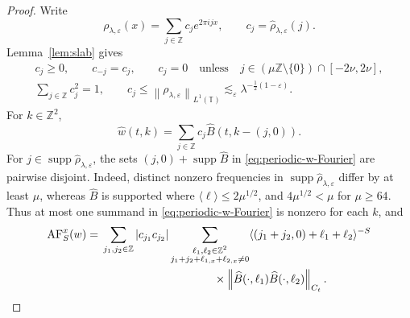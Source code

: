 \documentclass[12pt,reqno,letterpaper]{amsart}
\numberwithin{equation}{section}
\theoremstyle{definition}
\newcommand{\T}{\mathbb T}
\newcommand{\Z}{\mathbb Z}
\newcommand{\eps}{\varepsilon}
\newcommand{\la}{\lambda}
\newcommand{\supp}{\operatorname{supp}}
\newcommand{\norm}[1]{\left\lVert #1\right\rVert}
\newcommand{\abs}[1]{\left\lvert #1\right\rvert}
\begin{document}
\begin{proof}
Write
\begin{equation*}
   \rho_{\la,\eps}(x)=\sum_{j\in\Z}c_je^{2\pi ijx},
   \qquad c_j=\widehat\rho_{\la,\eps}(j).
\end{equation*}
Lemma~\ref{lem:slab} gives
\begin{equation}\label{eq:periodic-profile-coefficients}
\begin{gathered}
   c_j\geq0,\qquad c_{-j}=c_j,\qquad
   c_j=0\quad\text{unless}\quad
       j\in(\mu\Z\setminus\{0\})\cap[-2\nu,2\nu],\\
   \sum_{j\in\Z}c_j^2=1,\qquad
   c_j\leq\norm{\rho_{\la,\eps}}_{L^1(\T)}
       \lesssim_\eps\la^{-\frac12(1-\eps)}.
\end{gathered}
\end{equation}
For $k\in\Z^2$,
\begin{equation}\label{eq:periodic-w-Fourier}
   \widehat w(t,k)
      =\sum_{j\in\Z}c_j
          \widehat B(t,k-(j,0)).
\end{equation}
For $j\in\supp\widehat\rho_{\la,\eps}$, the sets
$(j,0)+\supp\widehat B$ in \eqref{eq:periodic-w-Fourier} are pairwise
disjoint.  Indeed, distinct nonzero frequencies in
$\supp\widehat\rho_{\la,\eps}$ differ by at least
$\mu$, whereas $\widehat B$ is supported where
$\langle\ell\rangle\leq2\mu^{1/2}$, and $4\mu^{1/2}<\mu$ for
$\mu\geq64$.  Thus at most one summand in
\eqref{eq:periodic-w-Fourier} is nonzero for each $k$, and
\begin{equation*}
\begin{split}
   \operatorname{AF}_S^x(w)
   ={}&\sum_{j_1,j_2\in\Z}\abs{c_{j_1}c_{j_2}}
      \sum_{\substack{\ell_1,\ell_2\in\Z^2\\
       j_1+j_2+\ell_{1,x}+\ell_{2,x}\neq0}}
       \langle(j_1+j_2,0)+\ell_1+\ell_2\rangle^{-S}\\
   &\hspace{35mm}\times
       \norm{\widehat B(\cdot,\ell_1)
              \widehat B(\cdot,\ell_2)}_{C_t}.
\end{split}
\end{equation*}


\end{proof}
\end{document}
